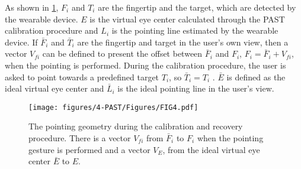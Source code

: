 {As shown in \figurename{ \ref{fig:fingertipOffset}}, $F_i$  and $T_i$  are the fingertip and the target, which are detected by the wearable device. $E$ is the virtual eye center calculated through the PAST calibration procedure and $L_i$ is the pointing line estimated by the wearable device. If $\bar F_i$ and $\bar T_i$ are the fingertip and target in the user's own view, then a vector $V_{fi}$ can be defined to present the offset between $\bar F_i$ and $F_i$, $F_i = {\bar F_i} + V_{fi}$, when the pointing is performed.
During the calibration procedure, the user is asked to point towards a predefined target $T_i$, so ${\bar T_i} = T_i$ .
$\bar E$ is defined as the ideal virtual eye center and $\bar L_i$ is the ideal pointing line in the user's view. }
\begin{figure} 
	\centering
	\texttt{[image: figures/4-PAST/Figures/FIG4.pdf]}
	\caption{ The pointing geometry during the calibration and recovery procedure. There is a vector $V_{fi}$  from $\bar F_i$ to $F_i$ when the pointing gesture is performed and a vector $V_{E}$, from the ideal virtual eye center ${\bar E}$ to $E$.}
	\label{fig:fingertipOffset}
\end{figure}
